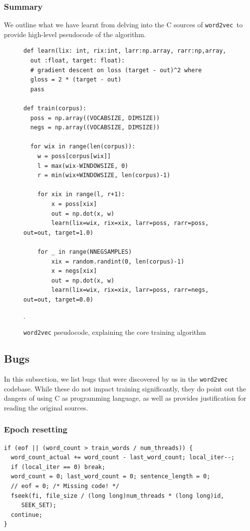 \documentclass[11pt]{book}
\newcommand{\wtov}{\texttt{word2vec }}
\begin{document}
\subsubsection{Summary}

We outline what we have learnt from delving into the C sources
of \wtov to provide high-level pseudocode of the algorithm.

\begin{figure}[htb]
\begin{verbatim}
def learn(lix: int, rix:int, larr:np.array, rarr:np,array,
  out :float, target: float):
  # gradient descent on loss (target - out)^2 where
  gloss = 2 * (target - out)
  pass

def train(corpus):
  poss = np.array((VOCABSIZE, DIMSIZE))
  negs = np.array((VOCABSIZE, DIMSIZE))

  for wix in range(len(corpus)):
    w = poss[corpus[wix]]
    l = max(wix-WINDOWSIZE, 0)
    r = min(wix+WINDOWSIZE, len(corpus)-1)

    for xix in range(l, r+1):
        x = poss[xix]
        out = np.dot(x, w)
        learn(lix=wix, rix=xix, larr=poss, rarr=poss, out=out, target=1.0)

    for _ in range(NNEGSAMPLES)
        xix = random.randint(0, len(corpus)-1)
        x = negs[xix]
        out = np.dot(x, w)
        learn(lix=wix, rix=xix, larr=poss, rarr=negs, out=out, target=0.0)
\end{verbatim}
\caption{\texttt{word2vec} pseudocode, explaining the core training algorithm}.
\label{fig:w2v-py-pseudocode}
\end{figure}

\subsection{Bugs}

In this subsection, we list bugs that were discovered by us in the \texttt{word2vec}
codebase. While these do not impact training significantly, they do point out
the dangers of using C as programming language, as well as provides justification
for reading the original sources.

\subsubsection{Epoch resetting}

\begin{verbatim}
if (eof || (word_count > train_words / num_threads)) {
  word_count_actual += word_count - last_word_count; local_iter--;
  if (local_iter == 0) break;
  word_count = 0; last_word_count = 0; sentence_length = 0;
  // eof = 0; /* Missing code! */
  fseek(fi, file_size / (long long)num_threads * (long long)id,
     SEEK_SET);
  continue;
}
\end{verbatim}
\end{document}
